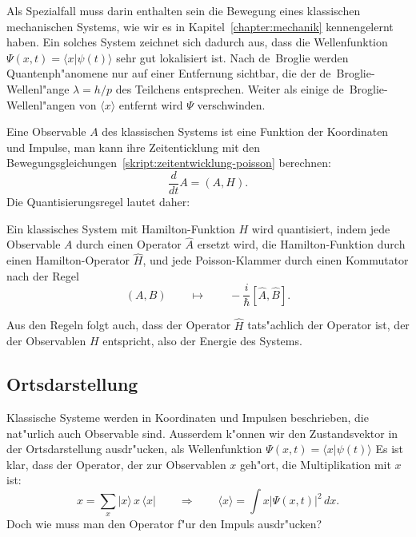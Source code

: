 Als Spezialfall muss darin enthalten sein die Bewegung eines klassischen
mechanischen Systems, wie wir es in Kapitel~\ref{chapter:mechanik}
kennengelernt haben.
Ein solches System zeichnet sich dadurch aus, dass die Wellenfunktion
$\Psi(x,t)=\langle x|\psi(t)\rangle$
sehr gut lokalisiert ist.
Nach de~Broglie werden Quantenph"anomene nur auf einer Entfernung sichtbar,
die der de~Broglie-Wellenl"ange $\lambda=h/p$ des Teilchens entsprechen.
Weiter als einige de~Broglie-Wellenl"angen von $\langle x\rangle$
entfernt wird $\Psi$ verschwinden.

Eine Observable $A$ des klassischen Systems ist eine Funktion der
Koordinaten und Impulse, man kann ihre Zeitenticklung mit den
Bewegungsgleichungen~\ref{skript:zeitentwicklung-poisson}
berechnen:
\[
\frac{d}{dt}A=(A,H).
\]
Die Quantisierungsregel lautet daher:

\begin{satz}
\label{skript:quantisierung-poisson}
Ein klassisches System mit Hamilton-Funktion $H$ wird quantisiert, indem
jede Observable $A$ durch einen Operator $\hat A$ ersetzt wird, die
Hamilton-Funktion durch einen Hamilton-Operator $\hat H$, und jede
Poisson-Klammer durch einen Kommutator nach der Regel
\begin{equation}
(A,B)
\qquad
\mapsto
\qquad
-\frac{i}{\hbar}[\hat A,\hat B].
\label{skript:quantisierung-observable}
\end{equation}
\end{satz}
Aus den Regeln folgt auch, dass der Operator $\hat H$ tats"achlich
der Operator ist, der der Observablen $H$ entspricht, also der 
Energie des Systems.
\label{skript:hamilton-op-ist-energie}

\subsection{Ortsdarstellung}
Klassische Systeme werden in Koordinaten und Impulsen beschrieben, 
die nat"urlich auch Observable sind.
Ausserdem k"onnen wir den Zustandsvektor in der Ortsdarstellung
ausdr"ucken, als Wellenfunktion $\Psi(x,t)=\langle x|\psi(t)\rangle$
Es ist klar, dass der Operator, der zur Observablen $x$ geh"ort,
die Multiplikation mit $x$ ist:
\[
x
=
\sum_x |x\rangle\,x\,\langle x|
\qquad\Rightarrow\qquad
\langle x\rangle
=
\int x|\Psi(x,t)|^2\,dx.
\]
Doch wie muss man den Operator f"ur den Impuls ausdr"ucken?

